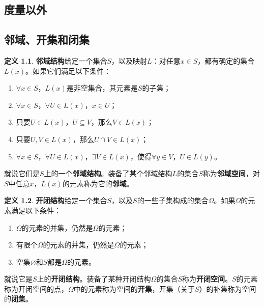 \documentclass[12pt,UTF8]{ctexbook}
\theoremstyle{definition}
\newtheorem{df}{定义}[section]
\theoremstyle{plain}
\begin{document}
\begin{appendix}

\chapter{度量以外}

\section{邻域、开集和闭集}

\begin{df}{\textbf{邻域结构}}\label{df:a-0-0}
    给定一个集合$S$，以及映射$L$：对任意$x\in S$，都有确定的集合$L(x)$。如果它们满足以下条件：
    \begin{enumerate}
        \item $\forall x\in S$，$L(x)$是非空集合，其元素是$S$的子集；
        \item $\forall x\in S$，$\forall U \in L(x)$，$x\in U$；
        \item 只要$U\in L(x)$，$U\subseteq V$，那么$V\in L(x)$；
        \item 只要$U, V\in L(x)$，那么$U\cap V \in L(x)$；
        \item $\forall x\in S$，$\forall U\in L(x)$，$\exists V \in L(x)$，使得$\forall y\in V$，$U\in L(y)$。
    \end{enumerate}
    就说它们是$S$上的一个\textbf{邻域结构}。装备了某个邻域结构$L$的集合$S$称为\textbf{邻域空间}，对$S$中任意$x$，$L(x)$的元素称为它的\textbf{邻域}。
\end{df}

\begin{df}{\textbf{开闭结构}}\label{df:a-0-1}
    给定一个集合$S$，以及$S$的一些子集构成的集合$\Omega$。如果$\Omega$的元素满足以下条件：
    \begin{enumerate}
        \item $\Omega$的元素的并集，仍然是$\Omega$的元素；
        \item 有限个$\Omega$的元素的并集，仍然是$\Omega$的元素；
        \item 空集$\varnothing$和$S$都是$\Omega$的元素。
    \end{enumerate}
    就说它是$S$上的\textbf{开闭结构}。装备了某种开闭结构$\Omega$的集合$S$称为\textbf{开闭空间}。$S$的元素称为开闭空间的点，$\Omega$中的元素称为空间的\textbf{开集}，开集（关于$S$）的补集称为空间的\textbf{闭集}。
\end{df}


\end{appendix}
\end{document}
